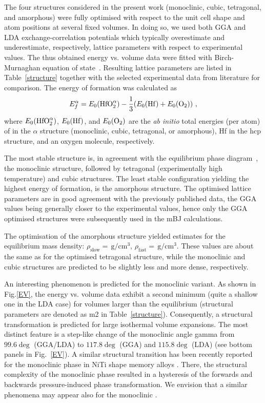 \documentclass[10pt,a4paper,twocolumn]{article}
\begin{document}
The four structures considered in the present work (monoclinic, cubic, tetragonal, and amorphous) were fully optimised with respect to the unit cell shape and atom positions at several fixed volumes.
In doing so, we used both GGA and LDA exchange-correlation potentials which typically overestimate and underestimate, respectively, lattice parameters with respect to experimental values.
The thus obtained energy vs. volume data were fitted with Birch-Murnaghan equation of state~\cite{Birch1947}.
Resulting lattice parameters are listed in Table~\ref{structure} together with the selected experimental data from literature for comparison.
The energy of formation was calculated as
\begin{equation}
  E_f^\alpha=E_0(\ce{HfO2}^\alpha) - \frac13 (E_0(\ce{Hf}) + E_0(\ce{O2}))\ ,
\end{equation}
where $E_0(\ce{HfO2}^\alpha)$, $E_0(\ce{Hf})$, and $E_0(\ce{O2})$ are the \textit{ab initio} total energies (per atom) of  in the $\alpha$ structure (monoclinic, cubic, tetragonal, or amorphous), Hf in the hcp structure, and an oxygen molecule, respectively.

The most stable structure is, in agreement with the equilibrium phase diagram~\cite{Villars2014-px}, the monoclinic structure, followed by tetragonal (experimentally high temperature) and cubic structures.
The least stable configuration yielding the highest energy of formation, is the amorphous structure.
The optimised lattice parameters are in good agreement with the previously published data, the GGA values being generally closer to the experimental values, hence only the GGA optimised structures were subsequently used in the mBJ calculations.

The optimisation of the amorphous structure yielded estimates for the equilibrium mass density: $\rho_{\mathrm{slow}}=\,\mathrm{g/cm^3}$, $\rho_{\mathrm{fast}}=\,\mathrm{g/cm^3}$. %
These values are about the same as for the optimised tetragonal structure, while the monoclinic and cubic structures are predicted to be slightly less and more dense, respectively.

An interesting phenomenon is predicted for the monoclinic variant.
As shown in Fig.\ref{EV}, the energy vs. volume data exhibit a second minimum (quite a shallow one in the LDA case) for volumes larger than the equilibrium (structural parameters are denoted as m2 in Table~\ref{structure}).
Consequently, a structural transformation is predicted for large isothermal volume expansions.
The most distinct feature is a step-like change of the monoclinic angle gamma from $99.6\deg$ (GGA/LDA) to $117.8\deg$ (GGA) and $115.8\deg$ (LDA) (see bottom panels in Fig.~\ref{EV}).
A similar structural transition has been recently reported for the monoclinic phase in NiTi shape memory alloys \cite{Holec2011-tg}.
There, the structural complexity of the monoclinic phase resulted in a hysteresis of the forwards and backwards pressure-induced phase transformation.
We envision that a similar phenomena may appear also for the monoclinic .
\end{document}
